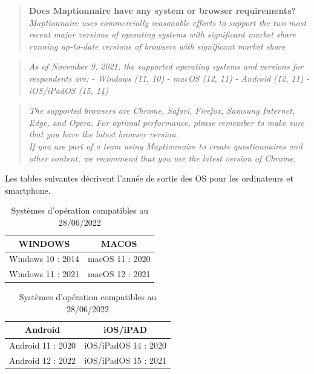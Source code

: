 \documentclass[
  12pt,
  a4paperpaper,
]{book}
\begin{document}
\begin{quote}
\textbf{Does Maptionnaire have any system or browser requirements?}
\emph{Maptionnaire uses commercially reasonable efforts to support the
two most recent major versions of operating systems with significant
market share running up-to-date versions of browsers with significant
market share}
\end{quote}

\begin{quote}
\emph{As of November 9, 2021, the supported operating systems and
versions for respondents are:} \emph{- Windows (11, 10)} \emph{- macOS
(12, 11)} \emph{- Android (12, 11)} \emph{- iOS/iPadOS (15, 14)}
\end{quote}

\begin{quote}
\emph{The supported browsers are Chrome, Safari, Firefox, Samsung
Internet, Edge, and Opera. For optimal performance, please remember to
make sure that you have the latest browser version.\\
If you are part of a team using Maptionnaire to create questionnaires
and other content, we recommend that you use the latest version of
Chrome.}
\end{quote}

Les tables suivantes décrivent l'année de sortie des OS pour les
ordinateurs et smartphone.

\begin{table}

\caption{\label{tbl-panel}Systèmes d'opération compatibles au
28/06/2022}\begin{minipage}[t]{0.50\linewidth}

{\centering 

\begin{tabular}[t]{cc}
\toprule
WINDOWS & MACOS\\
\midrule
Windows 10 : 2014 & macOS 11 : 2020\\
Windows 11 : 2021 & macOS 12 : 2021\\
\bottomrule
\end{tabular}

}

\end{minipage}%
%
\begin{minipage}[t]{0.50\linewidth}

{\centering 

\begin{tabular}[t]{cc}
\toprule
Android & iOS/iPAD\\
\midrule
Android 11 : 2020 & iOS/iPadOS 14 : 2020\\
Android 12 : 2022 & iOS/iPadOS 15 : 2021\\
\bottomrule
\end{tabular}

}

\end{minipage}%

\end{table}
\end{document}
